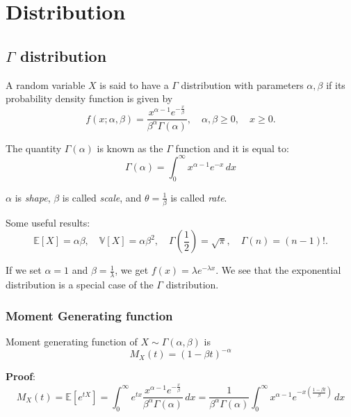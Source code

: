\documentclass{book}
\begin{document}
\chapter{Distribution}
\section{$\Gamma$ distribution}
A random variable $X$ is said to have a $\Gamma$ distribution with parameters $\alpha,\beta$ if its probability density function is given by
\begin{equation}
    f(x;\alpha,\beta)=\frac{x^{\alpha -1}e^{-\frac{x}{\beta}}}{\beta^{\alpha}\Gamma(\alpha)},\quad \alpha,\beta\geq 0, \quad x\geq 0.
\end{equation}

The quantity $\Gamma(\alpha)$ is known as the $\Gamma$ function and it is equal to:
\begin{equation}
    \Gamma(\alpha)=\int_{0}^{\infty}x^{\alpha-1}e^{-x}\,dx
\end{equation}

$\alpha$ is \emph{shape}, $\beta$ is called \emph{scale}, and $\theta=\frac{1}{\beta}$ is called \emph{rate}.

Some useful results:
\begin{equation*}
    \mathbb{E}[X]=\alpha\beta, \quad \mathbb{V}[X]=\alpha \beta^{2},\quad \Gamma(\frac{1}{2})=\sqrt{\pi},\quad \Gamma(n)=(n-1)! .
\end{equation*}

If we set $\alpha = 1$ and $\beta=\frac{1}{\lambda}$, we get $f(x)=\lambda e^{-\lambda x}$. We see that the exponential distribution is a special case of the $\Gamma$ distribution.

\subsection{Moment Generating function}

Moment generating function of $X\sim \Gamma(\alpha,\beta)$ is
\begin{equation}
    M_{X}(t) = (1-\beta t)^{-\alpha}
\end{equation}

\noindent \textbf{Proof}:\\
\begin{equation}
    M_{X}(t)=\mathbb{E}[e^{tX}]=\int_{0}^{\infty} e^{tx}\frac{x^{\alpha-1}e^{-\frac{x}{\beta}}}{\beta^{\alpha}\Gamma(\alpha)}\,dx=\frac{1}{\beta^{\alpha}\Gamma(\alpha)}\int_{0}^{\infty} x^{\alpha-1}e^{-x(\frac{1-\beta t}{\beta})}\,dx
\end{equation}
\end{document}
